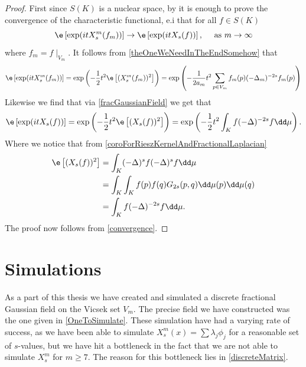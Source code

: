 \begin{proof}
	First since $S(K)$ is a nuclear space, by \cite[Corollary~2.4]{biermé2017generalizedrandomfieldslevys} it is enough to prove the convergence of the characteristic functional, e.i that for all $f \in S(K)$
	\begin{equation}
		\e \left[\exp(itX_{s}^{m}(f_m))\right] \to \e \left[\exp(itX_{s}(f))\right], \quad \text{ as } m \to \infty
	\end{equation} 
	where $f_m = f \mid_{V_m}$. It follows from \cref{theOneWeNeedInTheEndSomehow} that
	\begin{equation}
		\e \left[\exp(itX_{s}^{m}(f_m))\right] = \exp \left(-\frac{1}{2} t^2 \e \left[(X_{s}^{m}(f_m))^2\right]\right) = \exp \left(-\frac{1}{2a_m} t^2  \sum_{p \in V_m} f_m(p) (-\Delta_m)^{-2s} f_m(p)\right)
	\end{equation}
	Likewise we find that via \cref{fracGaussianField} we get that
	\begin{equation}
		\e \left[\exp(i t X_{s}(f))\right] = \exp\left(-\frac{1}{2} t^2 \e \left[(X_{s}(f))^2\right]\right) = \exp\left(-\frac{1}{2}t^2 \int_{K} f (-\Delta)^{-2s}f \dd \mu\right).
	\end{equation} 
	Where we notice that from \cref{coroForRieszKernelAndFractionalLaplacian}
	\begin{align}
		\e \left[(X_{s}(f))^2\right] &= \int_{K} (-\Delta)^{s}f (-\Delta)^{s}f \dd \mu \\
		& = \int_{K} \int_{K} f(p)f(q) G_{2s}(p,q) \dd\mu(p) \dd \mu(q) \\
		& = \int_{K} f (-\Delta)^{-2s}f \dd \mu.
	\end{align}
	The proof now follows from \cref{convergence}.
\end{proof}

\section{Simulations}
As a part of this thesis we have created and simulated a discrete fractional Gaussian field on the Vicsek set $V_m$. The precise field we have constructed was the one given in \cref{OneToSimulate}. 
These simulation have had a varying rate of success, as we have been able to simulate $X_s^{m}(x) = \sum\lambda_j \phi_j$ for a reasonable set of $s$-values, but we have hit a bottleneck in the fact that we are not able to simulate $X_s^{m}$ for $m \geq 7$. The reason for this bottleneck lies in \cref{discreteMatrix}. 

